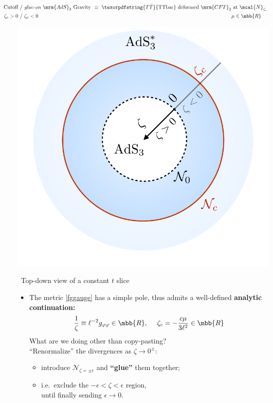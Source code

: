\documentclass[10pt]{article}
\newcommand{\TTbar}{\texorpdfstring{\ensuremath{T\bar{T}}}{TTbar}\xspace}
\begin{document}
\begin{multicols}{3}
\parbox{\linewidth}{
\vspace{-\baselineskip}
\textbf{\begin{equation*}
\hspace{-3em}
\begin{aligned}
	\textrm{Cutoff}
	\ &/\ %
	\text{\textit{glue-on} $\mrm{AdS}_3$ Gravity}
	\!\!&\equiv\ %
	\textrm{\TTbar deformed $\mrm{CFT}_2$ at $\mcal{N}_{\zeta_c}$} \\
	\zeta_c > 0
	\ &/\ %
	\zeta_c < 0
	& \mu \in \mbb{R}\hspace{1em}\,
\end{aligned}
\end{equation*}}
\begin{center}
	\vspace{-1\baselineskip}%
	\centering
	\includegraphics[width=.65\linewidth]{img/diagram.pdf}
	
	\vspace{-.5\baselineskip}
	\scriptsize\ Top-down view of a constant $t$ slice
\end{center}
}

\begin{itemize}

\item The metric \eqref{fggauge} has a simple pole, thus admits a well-defined \textbf{analytic continuation:}
\begin{equation}
	\frac{1}{\zeta} \equiv \ell^{-2} g_{\varphi\varphi} \in \mbb{R},
\ \quad
	\zeta_c = - \frac{c \mu}{3\ell^2} \in \mbb{R}
\end{equation}
What are we doing other than copy-pasting?\\
``Renormalize'' the divergences as $\zeta \to 0^\pm$:
	\begin{itemize}[noitemsep]\small
	\item introduce $\mathcal N_{\zeta={\pm\epsilon}}$ and \textbf{``glue''} them together;
	\item i.e.~exclude the $-\epsilon < \zeta < \epsilon$ region, \\ until finally sending $\epsilon \to 0$. 
	\end{itemize}
	

\end{itemize}
\end{multicols}
\end{document}
